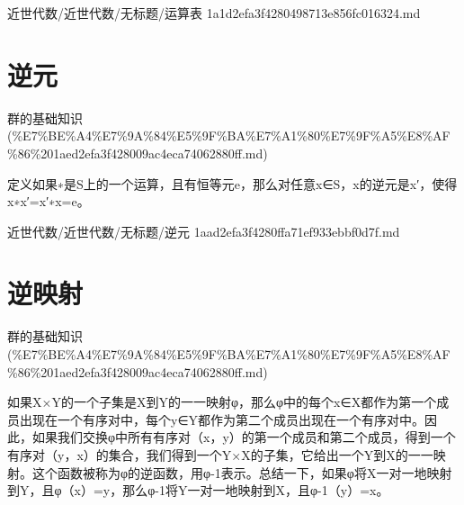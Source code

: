 \begin{note}[来源路径]

近世代数/近世代数/无标题/运算表 1a1d2efa3f4280498713e856fc016324.md

\end{note}

\section*{逆元}

\begin{note}[来源上级主题]

群的基础知识 (\%E7\%BE\%A4\%E7\%9A\%84\%E5\%9F\%BA\%E7\%A1\%80\%E7\%9F\%A5\%E8\%AF\%86\%201aed2efa3f428009ac4eca74062880ff.md)

\end{note}

\begin{note}[逆元]

定义如果∗是S上的一个运算，且有恒等元e，那么对任意x∈S，x的逆元是x′，使得x∗x′=x′∗x=e。

\end{note}

\begin{note}[来源路径]

近世代数/近世代数/无标题/逆元 1aad2efa3f4280ffa71ef933ebbf0d7f.md

\end{note}

\section*{逆映射}

\begin{note}[来源上级主题]

群的基础知识 (\%E7\%BE\%A4\%E7\%9A\%84\%E5\%9F\%BA\%E7\%A1\%80\%E7\%9F\%A5\%E8\%AF\%86\%201aed2efa3f428009ac4eca74062880ff.md)

\end{note}

\begin{note}[逆映射]

如果X×Y的一个子集是X到Y的一一映射φ，那么φ中的每个x∈X都作为第一个成员出现在一个有序对中，每个y∈Y都作为第二个成员出现在一个有序对中。因此，如果我们交换φ中所有有序对（x，y）的第一个成员和第二个成员，得到一个有序对（y，x）的集合，我们得到一个Y×X的子集，它给出一个Y到X的一一映射。这个函数被称为φ的逆函数，用φ-1表示。总结一下，如果φ将X一对一地映射到Y，且φ（x）=y，那么φ-1将Y一对一地映射到X，且φ-1（y）=x。

\end{note}

